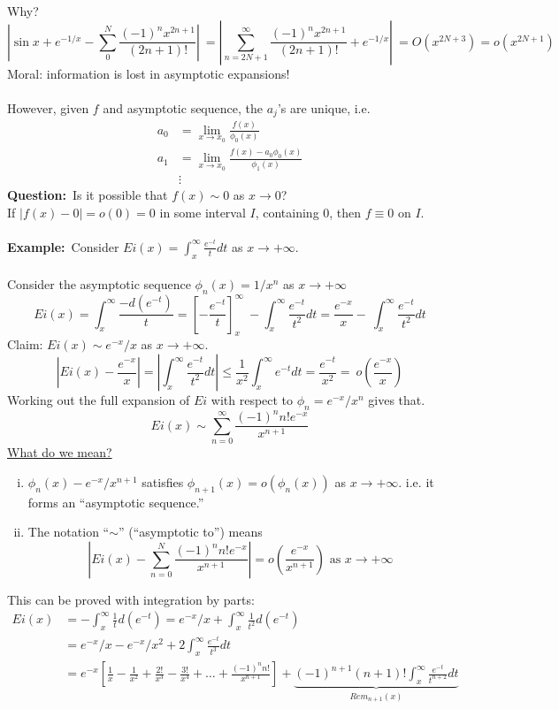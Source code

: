 \documentclass{article}
\newcommand{\example}{\textbf{Example:}}
\newcommand{\question}{\textbf{Question:}}
\begin{document}
Why?
\[ \left| \sin x + e^{-1/x} - \sum_0^N \frac{ (-1)^n x^{2n+1}}{(2n+1)!} \right| \
= \left| \sum_{n = 2N+1}^{\infty} \frac{(-1)^n x^{2n+1}}{(2n+1)!} + e^{-1/x} \right| \
=O(x^{2N+3}) = o(x^{2N+1}) \]
Moral: information is lost in asymptotic expansions!
\\
\\
However, given $f$ and asymptotic sequence, the $a_j$'s are unique, i.e.
\begin{align*}
a_0 &= \lim_{x \to x_0} \frac{f(x)}{\phi_0(x)} \\
a_1 &= \lim_{x \to x_0} \frac{f(x)-a_0 \phi_0(x)}{\phi_1(x)} \\
& \vdots
\end{align*}
\question\ Is it possible that $f(x) \sim 0$ as $x \to 0$?
\\
If $|f(x) - 0| = o(0)=0$ in some interval $I$, containing $0$, then
$f \equiv 0$ on $I$.
\\
\\
\example\ Consider $Ei(x) = \int_{x}^{\infty} \frac{e^{-t}}{t} dt$ as 
$x \to + \infty$.
\\
\\
Consider the asymptotic sequence $\phi_n(x) = 1/x^n$ as $x \to + \infty$
\[ Ei(x) = \int_{x}^{\infty} \frac{-d(e^{-t})}{t} = \left[ -\frac{e^{-t}}{t} \right]_{x}^{\infty} \
- \int_x^{\infty} \frac{e^{-t}}{t^2} dt = \frac{e^{-x}}{x} - \
\int_x^{\infty} \frac{e^{-t}}{t^2} dt\]
Claim: $Ei(x) \sim e^{-x}/x$ as $x \to + \infty$.
\[ \left| Ei(x) - \frac{e^{-x}}{x} \right| = \left| \int_x^{\infty} \frac{e^{-t}}{t^2} dt \right|
\leq \frac{1}{x^2} \int_x^{\infty} e^{-t} dt = \frac{e^{-t}}{x^2} = \
o\left(\frac{e^{-x}}{x} \right) \]
Working out the full expansion of $Ei$ with respect to
$\phi_n = e^{-x}/x^n$ gives that.
\[ Ei(x) \sim \sum_{n=0}^{\infty} \frac{(-1)^n n! e^{-x}}{x^{n+1}} \]
\underline{What do we mean?}
\begin{enumerate}[(i)]
\item $\phi_n (x) - e^{-x}/x^{n+1}$ satisfies
		$\phi_{n+1}(x) = o(\phi_n(x))$ as $x \to + \infty$.
		i.e. it forms an ``asymptotic sequence.''
\item The notation ``$\sim$'' (``asymptotic to'') means
\[ \left|Ei(x) - \sum_{n=0}^N \frac{(-1)^n n! e^{-x} }{x^{n+1}} \right| = o\left(
\frac{e^{-x}}{x^{n+1}} \right) \mbox{ as } x \to + \infty\]
\end{enumerate}
This can be proved with integration by parts:
\begin{align*}
Ei(x) &= -\int_x^{\infty} \frac{1}{t} d(e^{-t}) = e^{-x}/x + \int_x^{\infty}
\frac{1}{t^2} d(e^{-t}) \\
&= e^{-x}/x - e^{-x}/x^2 + 2 \int_x^{\infty} \frac{e^{-t}}{t^3}dt  \\
&= e^{-x} \left[ \frac{1}{x} - \frac{1}{x^2} + \frac{2!}{x^3} - \frac{3!}{x^4}
+ \dots + \frac{(-1)^n n!}{x^{n+1}} \right] + \underbrace{(-1)^{n+1} (n+1)!
\int_x^{\infty} \frac{e^{-t}}{t^{n+2}} dt}_{Rem_{n+1}(x)}
\end{align*}
\end{document}

